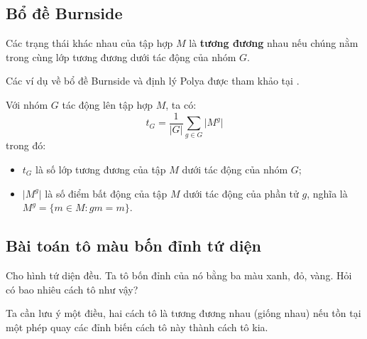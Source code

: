 \subsection*{Bổ đề Burnside}

Các trạng thái khác nhau của tập hợp $M$ là \textbf{tương đương} nhau nếu chúng nằm trong cùng lớp tương đương dưới tác động của nhóm $G$.

Các ví dụ về bổ đề Burnside và định lý Polya được tham khảo tại \cite{Tarannikov}.

\begin{lemma}[Bổ đề Burnside]
    Với nhóm $G$ tác động lên tập hợp $M$, ta có:
    \begin{equation*}
        t_G = \frac{1}{\lvert G \rvert} \sum_{g \in G} \lvert M^g \rvert
    \end{equation*}
    trong đó:
    \begin{itemize}
        \item  $t_G$ là số lớp tương đương của tập $M$ dưới tác động của nhóm $G$;
        \item $\lvert M^g \rvert$ là số điểm bất động của tập $M$ dưới tác động của phần tử $g$, nghĩa là $M^g = \{ m \in M : gm = m\}$.
    \end{itemize}
\end{lemma}

\subsection*{Bài toán tô màu bốn đỉnh tứ diện}

Cho hình tứ diện đều. Ta tô bốn đỉnh của nó bằng ba màu xanh, đỏ, vàng. Hỏi có bao nhiêu cách tô như vậy?

Ta cần lưu ý một điều, hai cách tô là tương đương nhau (giống nhau) nếu tồn tại một phép quay các đỉnh biến cách tô này thành cách tô kia.

